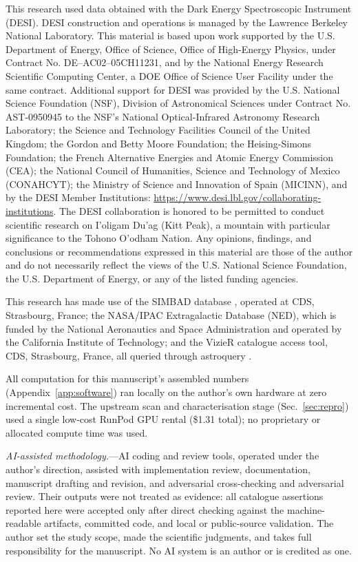 \documentclass[aps,prd,twocolumn,superscriptaddress,nofootinbib,longbibliography,floatfix]{revtex4-2}
\begin{document}
\begin{acknowledgments}
This research used data obtained with the Dark Energy Spectroscopic
Instrument (DESI).  DESI construction and operations is managed by the
Lawrence Berkeley National Laboratory.  This material is based upon work
supported by the U.S. Department of Energy, Office of Science, Office of
High-Energy Physics, under Contract No. DE--AC02--05CH11231, and by the
National Energy Research Scientific Computing Center, a DOE Office of
Science User Facility under the same contract.  Additional support for DESI
was provided by the U.S. National Science Foundation (NSF), Division of
Astronomical Sciences under Contract No. AST-0950945 to the NSF's National
Optical-Infrared Astronomy Research Laboratory; the Science and Technology
Facilities Council of the United Kingdom; the Gordon and Betty Moore
Foundation; the Heising-Simons Foundation; the French Alternative Energies
and Atomic Energy Commission (CEA); the National Council of Humanities,
Science and Technology of Mexico (CONAHCYT); the Ministry of Science and
Innovation of Spain (MICINN), and by the DESI Member Institutions:
\url{https://www.desi.lbl.gov/collaborating-institutions}.  The DESI
collaboration is honored to be permitted to conduct scientific research on
I'oligam Du'ag (Kitt Peak), a mountain with particular significance to the
Tohono O'odham Nation.  Any opinions, findings, and conclusions or
recommendations expressed in this material are those of the author and do
not necessarily reflect the views of the U.S. National Science Foundation,
the U.S. Department of Energy, or any of the listed funding agencies.

This research has made use of the SIMBAD database \cite{SIMBAD}, operated
at CDS, Strasbourg, France; the NASA/IPAC Extragalactic Database (NED),
which is funded by the National Aeronautics and Space Administration and
operated by the California Institute of Technology; and the VizieR
catalogue access tool, CDS, Strasbourg, France, all queried through
astroquery \cite{Ginsburg2019}.

All computation for this manuscript's assembled numbers (Appendix~\ref{app:software})
ran locally on the author's own hardware at zero incremental cost. The
upstream scan and characterisation stage (Sec.~\ref{sec:repro}) used a single low-cost
RunPod GPU rental (\$1.31 total); no proprietary or allocated compute time
was used.

\emph{AI-assisted methodology.}---AI coding and review tools, operated
under the author's direction, assisted with implementation review,
documentation, manuscript drafting and revision, and adversarial
cross-checking and adversarial review. Their outputs were not treated as
evidence: all catalogue assertions reported here were accepted only after
direct checking against the machine-readable artifacts, committed code, and
local or public-source validation. The author set the study scope, made the
scientific judgments, and takes full responsibility for the manuscript. No
AI system is an author or is credited as one.
\end{acknowledgments}
\end{document}
